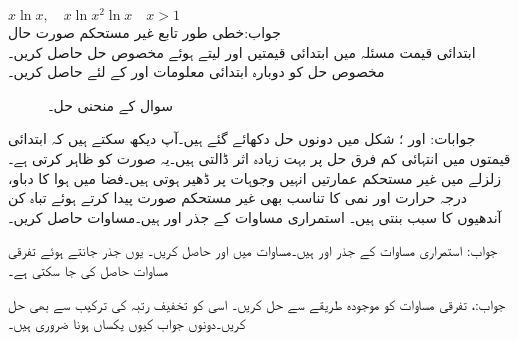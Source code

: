 $x\ln x, \quad x\ln x^2 \ln x\quad x>1$\\
جواب:خطی طور تابع
\quad غیر مستحکم صورت حال\\
ابتدائی قیمت مسئلہ  میں ابتدائی قیمتیں  اور  لیتے ہوئے مخصوص حل حاصل کریں۔مخصوص حل کو دوبارہ ابتدائی معلومات  اور  کے لئے حاصل کریں۔


\begin{figure}
\centering
{}
\caption{سوال  کے منحنی حل۔}
\label{شکل_سوال_سادہ_دو_درجی_غیر_مستحکم_الف}
\end{figure}

جوابات: اور ؛ شکل  میں دونوں حل دکھائے گئے ہیں۔آپ دیکھ سکتے ہیں کہ ابتدائی قیمتوں میں انتہائی کم فرق حل پر بہت زیادہ اثر ڈالتی ہیں۔یہ   صورت کو ظاہر کرتی ہے۔زلزلے  میں غیر مستحکم عمارتیں انہیں وجوہات پر ڈھیر ہوتی ہیں۔فضا میں ہوا کا دباو، درجہ حرارت اور نمی کا تناسب بھی غیر مستحکم صورت پیدا کرتے ہوئے  تباہ کن آندھیوں کا سبب بنتی ہیں۔
استمراری مساوات کے جذر  اور  ہیں۔مساوات  حاصل کریں۔

جواب: 
استمراری مساوات کے جذر  اور  ہیں۔مساوات  میں   اور  حاصل کریں۔ یوں جذر جانتے ہوئے تفرقی مساوات حاصل کی جا سکتی ہے۔

جواب:، 
تفرقی مساوات  کو موجودہ طریقے سے حل کریں۔ اسی کو تخفیف رتبہ کی ترکیب سے بھی حل  کریں۔دونوں جواب کیوں یکساں ہونا ضروری ہیں۔

